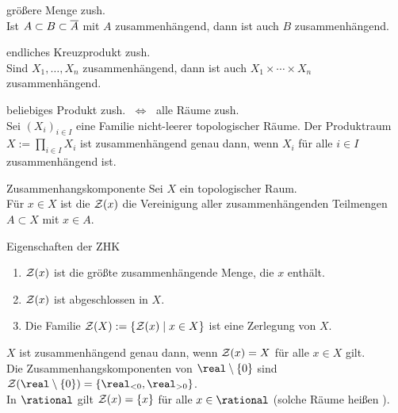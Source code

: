 \begin{Lemma}{größere Menge zush.}\\
    Ist $A \subset B \subset \overline{A}$ mit $A$ zusammenhängend,
    dann ist auch $B$ zusammenhängend.
\end{Lemma}

\begin{Lemma}{endliches Kreuzprodukt zush.}\\
    Sind $X_1, \dotsc, X_n$ zusammenhängend, dann ist auch
    $X_1 \times \dotsb \times X_n$ zusammenhängend.
\end{Lemma}

\begin{Satz}{beliebiges Produkt zush. $\;\Leftrightarrow\;$
             alle Räume zush.} \\
    Sei $(X_i)_{i \in I}$ eine Familie nicht-leerer topologischer Räume.
    Der Produktraum $X := \prod_{i \in I} X_i$ ist zusammenhängend
    genau dann, wenn $X_i$ für alle $i \in I$ zusammenhängend ist.
\end{Satz}

\linie
\pagebreak

\begin{Def}{Zusammenhangskomponente}
    Sei $X$ ein topologischer Raum. \\
    Für $x \in X$ ist die 
    $\mathcal{Z}(x)$ die Vereinigung aller zusammenhängenden Teilmengen $A \subset X$
    mit $x \in A$.
\end{Def}

\begin{Satz}{Eigenschaften der ZHK}
    \begin{enumerate}
        \item
        $\mathcal{Z}(x)$ ist die größte zusammenhängende Menge, die $x$ enthält.
        
        \item
        $\mathcal{Z}(x)$ ist abgeschlossen in $X$.
        
        \item
        Die Familie $\mathcal{Z}(X) := \{\mathcal{Z}(x) \;|\; x \in X\}$ ist eine
        Zerlegung von $X$.
    \end{enumerate}
\end{Satz}

\begin{Bsp}
    $X$ ist zusammenhängend genau dann, wenn $\mathcal{Z}(x) = X$ für alle
    $x \in X$ gilt. \\
    Die Zusammenhangskomponenten von $\real \setminus \{0\}$ sind
    $\zhk(\real \setminus \{0\}) = \{\real_{<0}, \real_{>0}\}$. \\
    In $\rational$ gilt $\mathcal{Z}(x) = \{x\}$ für alle $x \in \rational$
    (solche Räume heißen ).
\end{Bsp}

